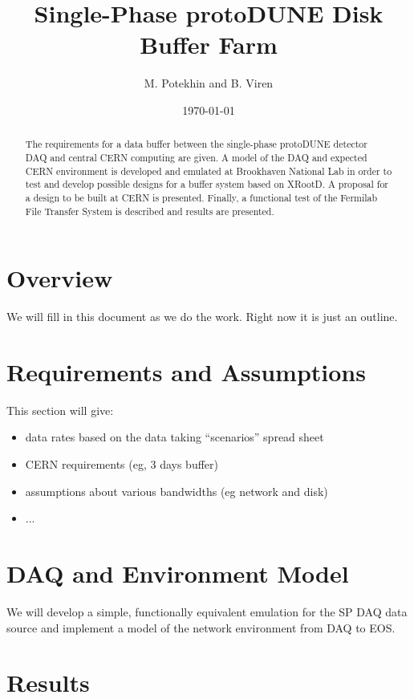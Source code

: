 \documentclass[pdftex,12pt,letter]{article}
\title{Single-Phase protoDUNE Disk Buffer Farm}
\date{\today}
\author{M. Potekhin and B. Viren}
\begin{document}
\maketitle

\begin{abstract}
  The requirements for a data buffer between the single-phase
  protoDUNE detector DAQ and central CERN computing are given.  A
  model of the DAQ and expected CERN environment is developed and
  emulated at Brookhaven National Lab in order to test and develop
  possible designs for a buffer system based on XRootD.  A proposal
  for a design to be built at CERN is presented.  Finally, a
  functional test of the Fermilab File Transfer System is described
  and results are presented.
\end{abstract}

\tableofcontents

\pagebreak


\section{Overview}

We will fill in this document as we do the work.  Right now it is just
an outline.

\section{Requirements and Assumptions}

This section will give:
\begin{itemize}
\item data rates based on the data taking ``scenarios'' spread sheet
\item CERN requirements (eg, 3 days buffer)
\item assumptions about various bandwidths (eg network and disk)
\item ...
\end{itemize}


\section{DAQ and Environment Model}

We will develop a simple, functionally equivalent emulation for the SP
DAQ data source and implement a model of the network environment from
DAQ to EOS.

\section{Results}
\end{document}
